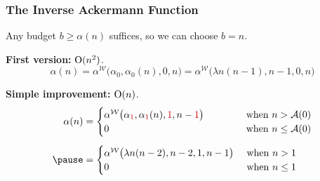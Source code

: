 \begin{frame}
\frametitle{The Inverse Ackermann Function}

Any budget $b \ge \alpha(n)$ suffices, so we can choose $b = n$.

\bigskip

\pause
\textbf{First version:} $\text{O}(n^2)$.
\pause
\begin{equation*}
\alpha(n) = \alpha^{\mathcal{W}}\big(\alpha_0, \alpha_0(n), 0, n\big)
= \alpha^{\mathcal{W}}\big(\lambda n(n - 1), n - 1, 0, n\big)
\end{equation*}

\smallskip

\pause
\textbf{Simple improvement:} $\text{O}(n)$.
\pause
\begin{equation*}
\begin{aligned}
\alpha(n) & = \begin{cases}
\alpha^{\mathcal{W}}\big(\alpha_{{\color{red} 1}}, \alpha_{{\color{red} 1}}(n), {{\color{red} 1}}, n - {{\color{red} 1}}\big) & \hspace{3em}\text{ when } n > \Ack(0) \\
0 & \hspace{3em}\text{ when } n \le \Ack(0)
\end{cases} \\[5pt]
\pause & = \begin{cases}
\alpha^{\mathcal{W}}\big(\lambda n(n - 2), n - 2, 1, n - 1\big) & \text{ when } n > 1 \\
0 & \text{ when } n \le 1
\end{cases}
\end{aligned}
\end{equation*}

\end{frame}



